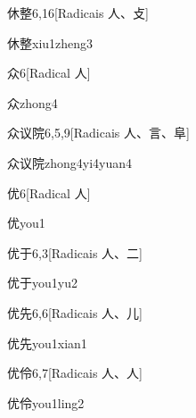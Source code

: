 \begin{entry}{休整}{6,16}[Radicais ⼈、⽁]
  \begin{phonetics}{休整}{xiu1zheng3}
  \end{phonetics}
\end{entry}

\begin{entry}{众}{6}[Radical ⼈]
  \begin{phonetics}{众}{zhong4}
  \end{phonetics}
\end{entry}

\begin{entry}{众议院}{6,5,9}[Radicais ⼈、⾔、⾩]
  \begin{phonetics}{众议院}{zhong4yi4yuan4}
  \end{phonetics}
\end{entry}

\begin{entry}{优}{6}[Radical ⼈]
  \begin{phonetics}{优}{you1}
  \end{phonetics}
\end{entry}

\begin{entry}{优于}{6,3}[Radicais ⼈、⼆]
  \begin{phonetics}{优于}{you1yu2}
  \end{phonetics}
\end{entry}

\begin{entry}{优先}{6,6}[Radicais ⼈、⼉]
  \begin{phonetics}{优先}{you1xian1}
  \end{phonetics}
\end{entry}

\begin{entry}{优伶}{6,7}[Radicais ⼈、⼈]
  \begin{phonetics}{优伶}{you1ling2}
  \end{phonetics}
\end{entry}

